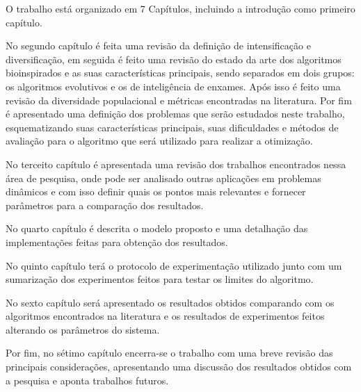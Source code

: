 O trabalho está organizado em 7 Capítulos, incluindo a introdução como primeiro capítulo.

No segundo capítulo é feita uma revisão da definição de intensificação e diversificação, em seguida é feito uma revisão do estado da arte dos algoritmos bioinspirados e as suas características principais, sendo separados em dois grupos: os algoritmos evolutivos e os de inteligência de enxames. Após isso é feito uma revisão da diversidade populacional e métricas encontradas na literatura. Por fim é apresentado uma definição dos problemas que serão estudados neste trabalho, esquematizando suas características principais, suas dificuldades e métodos de avaliação para o algoritmo que será utilizado para realizar a otimização.

No terceito capítulo é apresentada uma revisão dos trabalhos encontrados nessa área de pesquisa, onde pode ser analisado outras aplicações em problemas dinâmicos e com isso definir quais os pontos mais relevantes e fornecer parâmetros para a comparação dos resultados.

No quarto capítulo é descrita o modelo proposto e uma detalhação das implementações feitas para obtenção dos resultados.

No quinto capítulo terá o protocolo de experimentação utilizado junto com um sumarização dos experimentos feitos para testar os limites do algoritmo. 

No sexto capítulo será apresentado os resultados obtidos comparando com os algoritmos encontrados na literatura e os resultados de experimentos feitos alterando os parâmetros do sistema.

Por fim, no sétimo capítulo encerra-se o trabalho com uma breve revisão das principais considerações, apresentando uma discussão dos resultados obtidos com a pesquisa e aponta trabalhos futuros.
